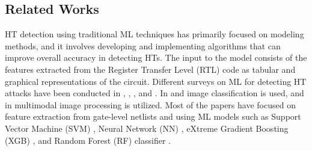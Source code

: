 



\subsection*{Related Works}
\label{Related}
HT detection using traditional ML techniques has primarily focused on modeling methods, and it involves developing and implementing algorithms that can improve overall accuracy in detecting HTs. The input to the model consists of the features extracted from the Register Transfer Level (RTL) code as tabular and graphical representations of the circuit. Different surveys on ML for detecting HT attacks have been conducted in \cite{huang2020survey}, \cite{gubbi2023hardware}, \cite{koylu2023survey}, and \cite{kundu2021application}. In \cite{botero2021hardware} and \cite{ashok2022hardware} image classification is used, and in \cite{10027082} multimodal image processing is utilized. Most of the papers have focused on feature extraction from gate-level netlists and using ML models such as Support Vector Machine (SVM) \cite{bao2014application}, Neural Network (NN) \cite{hasegawa2017hardware}, eXtreme Gradient Boosting (XGB) \cite{dong2019machine}, and Random Forest (RF) classifier \cite{hasegawa2017trojan}.

